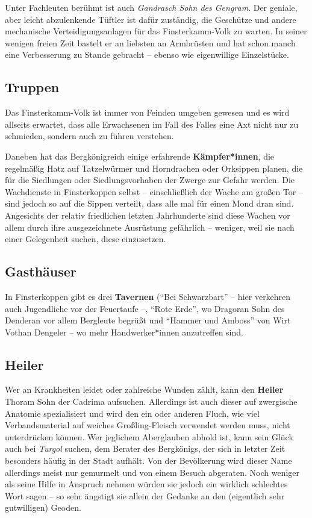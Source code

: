 \documentclass[openright]{Ilaris}
\newcommand{\fkv}{Finsterkamm-Volk }
\begin{document}
Unter Fachleuten berühmt ist auch \emph{Gandrasch Sohn des Gengram}. Der geniale, aber leicht abzulenkende Tüftler ist dafür zuständig, die Geschütze und andere mechanische Verteidigungsanlagen für das \fkv zu warten.
In seiner wenigen freien Zeit bastelt er an liebsten an Armbrüsten und hat schon manch eine Verbesserung zu Stande gebracht -- ebenso wie eigenwillige Einzelstücke.


\subsection{Truppen}

Das \fkv ist immer von Feinden umgeben gewesen und es wird allseits erwartet, dass alle Erwachsenen im Fall des Falles eine Axt nicht nur zu schmieden, sondern auch zu führen verstehen.

Daneben hat das Bergkönigreich einige erfahrende \textbf{Kämpfer*innen}, die regelmäßig Hatz auf Tatzelwürmer und Horndrachen oder Orksippen planen,
die für die Siedlungen oder Siedlungsvorhaben der Zwerge zur Gefahr werden.
Die Wachdienste in Finsterkoppen selbst -- einschließlich der Wache am großen Tor -- sind jedoch so auf die Sippen verteilt,
dass alle mal für einen Mond dran sind.
Angesichts der relativ friedlichen letzten Jahrhunderte sind diese Wachen vor allem durch ihre ausgezeichnete Ausrüstung gefährlich -- weniger, weil sie nach einer Gelegenheit suchen, diese einzusetzen.

\subsection{Gasthäuser}
In Finsterkoppen gibt es drei \textbf{Tavernen} (\enquote{Bei Schwarzbart} -- hier verkehren auch Jugendliche vor der Feuertaufe --, \enquote{Rote Erde}, wo Dragoran Sohn des Denderan vor allem Bergleute begrüßt und \enquote{Hammer und Amboss} von Wirt Vothan Dengeler -- wo mehr Handwerker*innen anzutreffen sind.

\subsection{Heiler}
Wer an Krankheiten leidet oder zahlreiche Wunden zählt, kann den \textbf{Heiler} Thoram Sohn der Cadrima aufsuchen.
Allerdings ist auch dieser auf zwergische Anatomie spezialisiert und wird den ein oder anderen Fluch, wie viel Verbandsmaterial auf weiches Großling-Fleisch verwendet werden muss, nicht unterdrücken können.
Wer jeglichem Aberglauben abhold ist, kann sein Glück auch bei \emph{Turgol} suchen, dem Berater des Bergkönigs, der sich in letzter Zeit besonders häufig in der Stadt aufhält.
Von der Bevölkerung wird dieser Name allerdings meist nur gemurmelt und von einem Besuch abgeraten.
Noch weniger als seine Hilfe in Anspruch nehmen würden sie jedoch ein wirklich schlechtes Wort sagen -- so sehr ängstigt sie allein der Gedanke an den (eigentlich sehr gutwilligen) Geoden.
\end{document}
